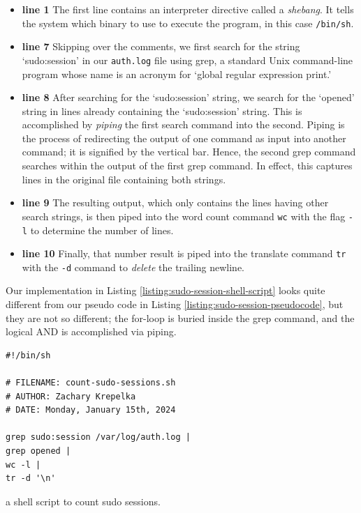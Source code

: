 \documentclass{article}
\begin{document}
\begin{itemize}[leftmargin=*]

	\item

		\textbf{line 1} The first line contains an interpreter
		directive called a \emph{shebang}. It tells the system which
		binary to use to execute the program, in this case
		\verb|/bin/sh|.

	\item

		\textbf{line 7} Skipping over the comments, we first search
		for the string `sudo:session' in our \verb|auth.log| file using
		grep, a standard Unix command-line program whose name is an
		acronym for `global regular expression print.'

	\item

		\textbf{line 8} After searching for the `sudo:session' string,
		we search for the `opened' string in lines already containing
		the `sudo:session' string.  This is accomplished by
		\emph{piping} the first search command into the second.  Piping
		is the process of redirecting the output of one command as input
		into another command; it is signified by the vertical bar.
		Hence, the second grep command searches within the output of the
		first grep command. In effect, this captures lines in the
		original file containing both strings.

	\item

		\textbf{line 9} The resulting output, which only contains the
		lines having other search strings, is then piped into the word
		count command \verb|wc| with the flag \verb|-l| to determine the
		number of lines.

	\item

		\textbf{line 10} Finally, that number result is piped into the
		translate command \verb|tr| with the \verb|-d| command to
		\emph{delete} the trailing newline.

\end{itemize}

Our implementation in Listing \ref{listing:sudo-session-shell-script} looks
quite different from our pseudo code in Listing
\ref{listing:sudo-session-pseudocode}, but they are not so different; the
for-loop is buried inside the grep command, and the logical AND is accomplished
via piping.

\begin{listing}
\begin{verbatim}
#!/bin/sh

# FILENAME: count-sudo-sessions.sh
# AUTHOR: Zachary Krepelka
# DATE: Monday, January 15th, 2024

grep sudo:session /var/log/auth.log |
grep opened |
wc -l |
tr -d '\n'
\end{verbatim}
\caption{a shell script to count sudo sessions.}
\label{listing:sudo-session-shell-script}
\end{listing}
\end{document}
